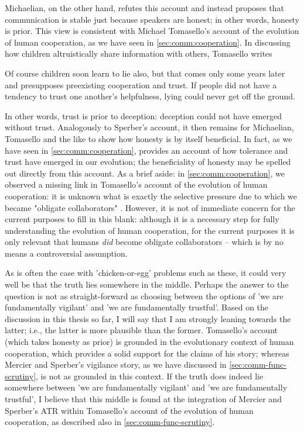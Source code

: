 Michaelian, on the other hand, refutes this account and instead proposes that communication is stable just because speakers are honest; in other words, honesty is prior. This view is consistent with Michael Tomasello's account of the evolution of human cooperation, as we have seen in \cref{sec:comm:cooperation}. In discussing how children altruistically share information with others, Tomasello writes
\begin{quoting}
    Of course children soon learn to lie also, but that comes only some years later and presupposes preexisting cooperation and trust. If people did not have a tendency to trust one another’s helpfulness, lying could never get off the ground.
    \hfill \citep[p.~21]{Tomasello09}
\end{quoting}
In other words, trust is prior to deception: deception could not have emerged without trust.
Analogously to Sperber's account, it then remains for Michaelian, Tomasello and the like to show how honesty is by itself beneficial. In fact,
as we have seen in \cref{sec:comm:cooperation}, \citet{Tomasello09} provides an account of how tolerance and trust have emerged in our evolution;
the beneficiality of honesty may be spelled out directly from this account.
As a brief aside: in \cref{sec:comm:cooperation}, we observed a missing link in Tomasello's account of the evolution of human cooperation: it is unknown what is exactly the selective pressure due to which we became "obligate collaborators" \citep[p.~75]{Tomasello09}. However, it is not of immediate concern for the current purposes to fill in this blank: although it is a necessary step for fully understanding the evolution of human cooperation, for the current purposes it is only relevant that humans \emph{did} become obligate collaborators -- which is by no means a controversial assumption.

As is often the case with 'chicken-or-egg' problems such as these, it could very well be that the truth lies somewhere in the middle. Perhaps the answer to the question is not as straight-forward as choosing between the options of 'we are fundamentally vigilant' and 'we are fundamentally trustful'.
Based on the discussion in this thesis so far, I will say that I am strongly leaning towards the latter; i.e., the latter is more plausible than the former. Tomasello's account (which takes honesty as prior) is grounded in the evolutionary context of human cooperation, which provides a solid support for the claims of his story;
whereas Mercier and Sperber's vigilance story, as we have discussed in \cref{sec:comm-func-scrutiny}, is not as grounded in this context.
If the truth does indeed lie somewhere between 'we are fundamentally vigilant' and 'we are fundamentally trustful', I believe that this middle is found at the integration of Mercier and Sperber's ATR within Tomasello's account of the evolution of human cooperation, as described also in \cref{sec:comm-func-scrutiny}.

